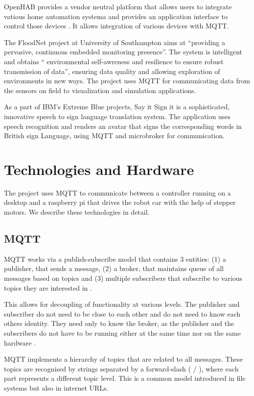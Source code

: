 \documentclass[sigconf]{acmart}
\begin{document}
OpenHAB provides a vendor neutral platform that allows users to integrate vatious home automation systema and provides an application interface to control those devices \cite{openhab}. It allows integration of various devices with MQTT.

The FloodNet project at University of Southampton \cite{floodnet} aims at ``providing a pervasive, continuous embedded monitoring presence''. The system is intelligent and obtains `` environmental self-awreness and resilience to ensure robust transmission of data'', ensuring data quality and allowing exploration of environments in new ways. The project uses MQTT for communicating data from the sensors on field to visualization and simulation applications.

As a part of IBM's Extreme Blue projects, Say it Sign it \cite{SiSi} is a sophisticated, innovative speech to sign language translation system. The application uses speech recognition and renders an avatar that signs the corresponding words in British sign Language, using MQTT and microbroker for communication.


\section{Technologies and Hardware}
The project uses MQTT to communicate between a controller running on a desktop and a raspberry pi that drives the robot car with the help of stepper motors. We describe these technologies in detail.

\subsection{MQTT}
MQTT works via a publish-subscribe model that contains 3 entities: (1) a
publisher, that sends a message, (2) a broker, that maintains queue of all
messages based on topics and (3) multiple subscribers that subscribe to
various topics they are interested in \cite{how-mqtt-works}.

This allows for decoupling of functionality at various levels. The
publisher and subscriber do not need to be close to each other and do
not need to know each others identity. They need only to know the
broker, as the publisher and the subscribers do not have to be running
either at the same time nor on the same hardware
\cite{hivemq-details}.

MQTT implements a hierarchy of topics that are related
to all messages. These topics are recognised by strings separated by a
forward-slash ( / ), where each part represents a different topic
level. This is a common model introduced in file systems but also in
internet URLs. 
\end{document}
